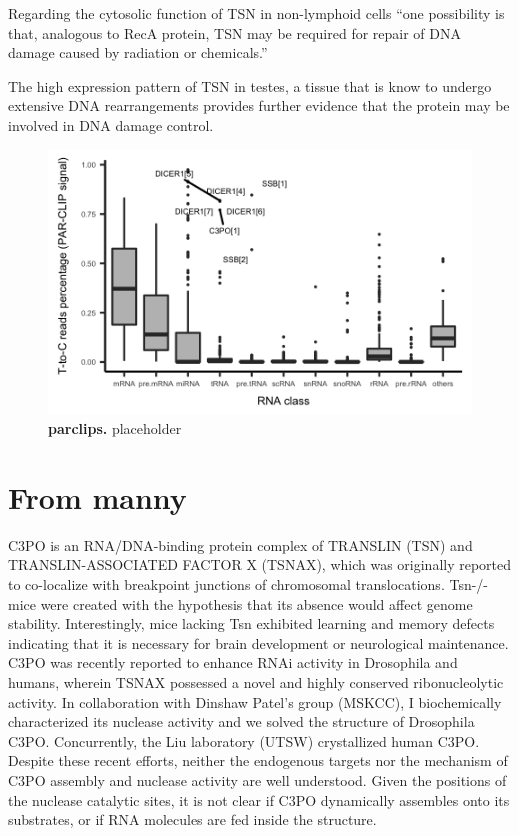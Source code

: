 \documentclass[12pt]{rockefeller}
\begin{document}
Regarding the cytosolic function of TSN in non-lymphoid cells “one possibility is that, analogous to RecA protein, TSN may be required for repair of DNA damage caused by radiation or chemicals.”

The high expression pattern of TSN in testes, a tissue that is know to undergo extensive DNA rearrangements provides further evidence that the protein may be involved in DNA damage control. 

\begin{figure}[!ht]%
\centering
\includegraphics[width = \textwidth]{parclips.png}%
\caption[parclips]
{\textbf{parclips.}
placeholder}
\centering
\label{parclips}%
\end{figure}

\section{From manny}
C3PO is an RNA/DNA-binding protein complex of TRANSLIN (TSN) and TRANSLIN-ASSOCIATED FACTOR X (TSNAX), which was originally reported to co-localize with breakpoint junctions of chromosomal translocations. Tsn-/- mice were created with the hypothesis that its absence would affect genome stability. Interestingly, mice lacking Tsn exhibited learning and memory defects indicating that it is necessary for brain development or neurological maintenance. C3PO was recently reported to enhance RNAi activity in Drosophila and humans, wherein TSNAX possessed a novel and highly conserved ribonucleolytic activity. In collaboration with Dinshaw Patel’s group (MSKCC), I biochemically characterized its nuclease activity and we solved the structure of Drosophila C3PO. Concurrently, the Liu laboratory (UTSW) crystallized human C3PO. Despite these recent efforts, neither the endogenous targets nor the mechanism of C3PO assembly and nuclease activity are well understood. Given the positions of the nuclease catalytic sites, it is not clear if C3PO dynamically assembles onto its substrates, or if RNA molecules are fed inside the structure.
\end{document}

